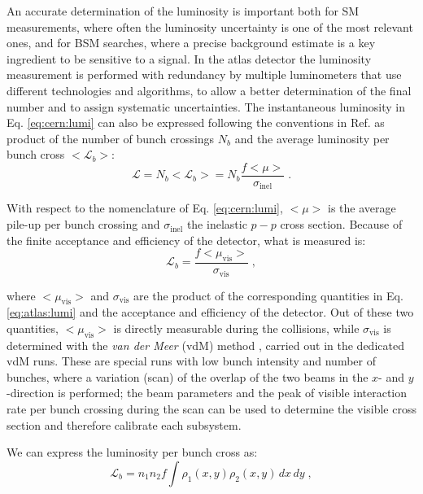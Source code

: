 An accurate determination of the luminosity is important both for SM measurements, where often the luminosity uncertainty is one of the most relevant ones, and for BSM searches, where a precise background estimate is a key ingredient to be sensitive to a signal. In the \gls{atlas} detector the luminosity measurement is performed with redundancy by multiple luminometers that use different technologies and algorithms, to allow a better determination of the final number and to assign systematic uncertainties. The instantaneous luminosity in Eq. \ref{eq:cern:lumi} can also be expressed following the conventions in Ref. \cite{Aaboud:2016hhf} as product of the number of bunch crossings $N_b$ and the average luminosity per bunch cross $<\mathcal{L}_b>$:
\begin{equation}
\mathcal{L} = N_b <\mathcal{L}_b> = N_b \frac{f <\mu>}{\sigma_{\mathrm{inel}} } \; .
\label{eq:atlas:lumi}
\end{equation}

With respect to the nomenclature of Eq. \ref{eq:cern:lumi}, $<\mu>$ is the average pile-up per bunch crossing and $\sigma_{\mathrm{inel}}$ the inelastic $p-p$ cross section. Because of the finite acceptance and efficiency of the detector, what is measured is:
\begin{equation}
\mathcal{L}_b = \frac{f <\mu_\mathrm{vis}>}{\sigma_{\mathrm{vis}} } \; ,
\end{equation}

where $<\mu_\mathrm{vis}>$ and $\sigma_{\mathrm{vis}}$ are the product of the corresponding quantities in Eq. \ref{eq:atlas:lumi} and the acceptance and efficiency of the detector. Out of these two quantities, $<\mu_\mathrm{vis}>$ is directly measurable during the collisions, while $\sigma_{\mathrm{vis}}$ is determined with the \textit{van der Meer} (vdM) method \cite{vanderMeer:296752}, carried out in the dedicated vdM runs. These are special runs with low bunch intensity and number of bunches, where a variation (scan) of the overlap of the two beams in the $x$- and $y$-direction is performed; the beam parameters and the peak of visible interaction rate per bunch crossing during the scan can be used to determine the visible cross section and therefore calibrate each subsystem. 

We can express the luminosity per bunch cross as:
\begin{equation}
\mathcal{L}_b = n_1 n_2 f \int \rho_1(x,y) \rho_2(x,y) \, dx \, dy \; ,
\label{eq:lumi_vdm1}
\end{equation}

